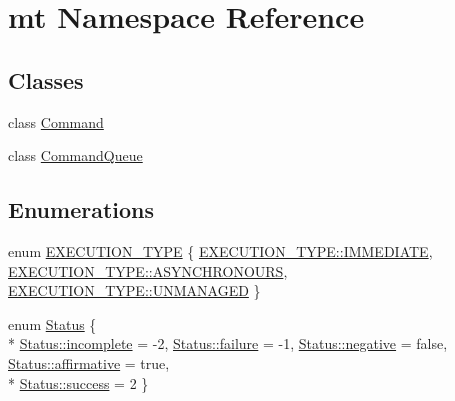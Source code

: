 \hypertarget{namespacemt}{}\section{mt Namespace Reference}
\label{namespacemt}
\subsection*{Classes}
\begin{DoxyCompactItemize}
\item 
class \hyperlink{classmt_1_1_command}{Command}
\item 
class \hyperlink{classmt_1_1_command_queue}{Command\+Queue}
\end{DoxyCompactItemize}
\subsection*{Enumerations}
\begin{DoxyCompactItemize}
\item 
enum \hyperlink{namespacemt_afb9453c305235c568158294078a7c5f3_afb9453c305235c568158294078a7c5f3}{E\+X\+E\+C\+U\+T\+I\+O\+N\+\_\+\+T\+Y\+PE} \{ \hyperlink{namespacemt_afb9453c305235c568158294078a7c5f3_afb9453c305235c568158294078a7c5f3ae35884a2445bc4ae2df52f188763273c}{E\+X\+E\+C\+U\+T\+I\+O\+N\+\_\+\+T\+Y\+P\+E\+::\+I\+M\+M\+E\+D\+I\+A\+TE}, 
\hyperlink{namespacemt_afb9453c305235c568158294078a7c5f3_afb9453c305235c568158294078a7c5f3a50e2d0c1a6b6eea4ea4774ab8204d6f5}{E\+X\+E\+C\+U\+T\+I\+O\+N\+\_\+\+T\+Y\+P\+E\+::\+A\+S\+Y\+N\+C\+H\+R\+O\+N\+O\+U\+RS}, 
\hyperlink{namespacemt_afb9453c305235c568158294078a7c5f3_afb9453c305235c568158294078a7c5f3a9adcd06a53fb18c2e2c0a28d5bb5f3ea}{E\+X\+E\+C\+U\+T\+I\+O\+N\+\_\+\+T\+Y\+P\+E\+::\+U\+N\+M\+A\+N\+A\+G\+ED}
 \}
\item 
enum \hyperlink{namespacemt_a37bcfa13fedca18b19425e07bb66e177_a37bcfa13fedca18b19425e07bb66e177}{Status} \{ \\*
\hyperlink{namespacemt_a37bcfa13fedca18b19425e07bb66e177_a37bcfa13fedca18b19425e07bb66e177a5ed4e9858ad8d239145ef285b6210a00}{Status\+::incomplete} = -\/2, 
\hyperlink{namespacemt_a37bcfa13fedca18b19425e07bb66e177_a37bcfa13fedca18b19425e07bb66e177a3ee28fe1a60c95b89d29317f122c7021}{Status\+::failure} = -\/1, 
\hyperlink{namespacemt_a37bcfa13fedca18b19425e07bb66e177_a37bcfa13fedca18b19425e07bb66e177a228d6a97a9838dc800e58b3c74ba7b11}{Status\+::negative} = false, 
\hyperlink{namespacemt_a37bcfa13fedca18b19425e07bb66e177_a37bcfa13fedca18b19425e07bb66e177a329c8a9aaa66d8ca4bc2804c3c8b0f4e}{Status\+::affirmative} = true, 
\\*
\hyperlink{namespacemt_a37bcfa13fedca18b19425e07bb66e177_a37bcfa13fedca18b19425e07bb66e177a260ca9dd8a4577fc00b7bd5810298076}{Status\+::success} = 2
 \}
\end{DoxyCompactItemize}


